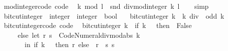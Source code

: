 \begin{isabellebody}
%
\endisadelimproof
\isanewline
{}\isamarkupfalse%
\ mod{\isacharunderscore}{\kern0pt}integer{\isacharunderscore}{\kern0pt}code\ {\isacharbrackleft}{\kern0pt}code{\isacharbrackright}{\kern0pt}{\isacharcolon}{\kern0pt}\isanewline
\ \ {\isachardoublequoteopen}k\ mod\ l\ {\isacharequal}{\kern0pt}\ snd\ {\isacharparenleft}{\kern0pt}divmod{\isacharunderscore}{\kern0pt}integer\ k\ l{\isacharparenright}{\kern0pt}{\isachardoublequoteclose}\isanewline
%
\isadelimproof
\ \ %
\endisadelimproof
%
\isatagproof
{}\isamarkupfalse%
\ simp%
\endisatagproof
{\isafoldproof}%
%
\isadelimproof
\isanewline
%
\endisadelimproof
\isanewline
{}\isamarkupfalse%
\ bit{\isacharunderscore}{\kern0pt}cut{\isacharunderscore}{\kern0pt}integer\ {\isacharcolon}{\kern0pt}{\isacharcolon}{\kern0pt}\ {\isachardoublequoteopen}integer\ {\isasymRightarrow}\ integer\ {\isasymtimes}\ bool{\isachardoublequoteclose}\isanewline
\ \ \ {\isachardoublequoteopen}bit{\isacharunderscore}{\kern0pt}cut{\isacharunderscore}{\kern0pt}integer\ k\ {\isacharequal}{\kern0pt}\ {\isacharparenleft}{\kern0pt}k\ div\ {}{\isacharcomma}{\kern0pt}\ odd\ k{\isacharparenright}{\kern0pt}{\isachardoublequoteclose}\isanewline
\isanewline
{}\isamarkupfalse%
\ bit{\isacharunderscore}{\kern0pt}cut{\isacharunderscore}{\kern0pt}integer{\isacharunderscore}{\kern0pt}code\ {\isacharbrackleft}{\kern0pt}code{\isacharbrackright}{\kern0pt}{\isacharcolon}{\kern0pt}\isanewline
\ \ {\isachardoublequoteopen}bit{\isacharunderscore}{\kern0pt}cut{\isacharunderscore}{\kern0pt}integer\ k\ {\isacharequal}{\kern0pt}\ {\isacharparenleft}{\kern0pt}if\ k\ {\isacharequal}{\kern0pt}\ {}\ then\ {\isacharparenleft}{\kern0pt}{}{\isacharcomma}{\kern0pt}\ False{\isacharparenright}{\kern0pt}\isanewline
\ \ \ \ \ else\ let\ {\isacharparenleft}{\kern0pt}r{\isacharcomma}{\kern0pt}\ s{\isacharparenright}{\kern0pt}\ {\isacharequal}{\kern0pt}\ Code{\isacharunderscore}{\kern0pt}Numeral{\isachardot}{\kern0pt}divmod{\isacharunderscore}{\kern0pt}abs\ k\ {}\isanewline
\ \ \ \ \ \ \ in\ {\isacharparenleft}{\kern0pt}if\ k\ {\isachargreater}{\kern0pt}\ {}\ then\ r\ else\ {\isacharminus}{\kern0pt}\ r\ {\isacharminus}{\kern0pt}\ s{\isacharcomma}{\kern0pt}\ s\ {\isacharequal}{\kern0pt}\ {}{\isacharparenright}{\kern0pt}{\isacharparenright}{\kern0pt}{\isachardoublequoteclose}\isanewline
%
\isadelimproof
%
\endisadelimproof
%
\isatagproof
{}\isamarkupfalse%
\ {\isacharminus}{\kern0pt}\isanewline
\ \ \isamarkupfalse%

\end{isabellebody}
